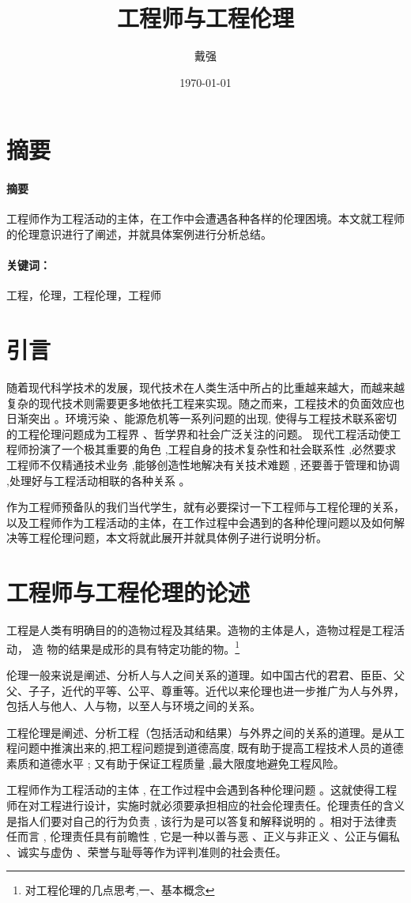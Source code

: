 \documentclass[a4paper,12pt]{ctexart}
\title{工程师与工程伦理}
\author{戴强}
\date{\today}
\renewenvironment*{abstract}[1]{%
\newcommand\gjc{#1}
\paragraph{摘要}
}{\paragraph{关键词：}\gjc }
\begin{document}
\maketitle
\newpage
\tableofcontents
\newpage
\section{摘要}
\quad
\quad

\begin{abstract}{工程，伦理，工程伦理，工程师}
  工程师作为工程活动的主体，在工作中会遭遇各种各样的伦理困境。本文就工程师的伦理意识进行了阐述，并就具体案例进行分析总结。
\end{abstract}

\newpage
\section{引言}
随着现代科学技术的发展，现代技术在人类生活中所占的比重越来越大，而越来越复杂的现代技术则需要更多地依托工程来实现。随之而来，工程技术的负面效应也日渐突出 。环境污染 、能源危机等一系列问题的出现, 使得与工程技术联系密切的工程伦理问题成为工程界 、哲学界和社会广泛关注的问题。
现代工程活动使工程师扮演了一个极其重要的角色 ,工程自身的技术复杂性和社会联系性 ,必然要求工程师不仅精通技术业务 ,能够创造性地解决有关技术难题 , 还要善于管理和协调 ,处理好与工程活动相联的各种关系 。

作为工程师预备队的我们当代学生，就有必要探讨一下工程师与工程伦理的关系，以及工程师作为工程活动的主体，在工作过程中会遇到的各种伦理问题以及如何解决等工程伦理问题，本文将就此展开并就具体例子进行说明分析。
\section{工程师与工程伦理的论述}
工程是人类有明确目的的造物过程及其结果。造物的主体是人，造物过程是工程活动， 造
物的结果是成形的具有特定功能的物。\footnote{对工程伦理的几点思考,一、基本概念}

伦理一般来说是阐述、分析人与人之间关系的道理。如中国古代的君君、臣臣、父父、子子，近代的平等、公平、尊重等。近代以来伦理也进一步推广为人与外界，包括人与他人、人与物，以至人与环境之间的关系。

工程伦理是阐述、分析工程（包括活动和结果）与外界之间的关系的道理。是从工程问题中推演出来的,把工程问题提到道德高度, 既有助于提高工程技术人员的道德素质和道德水平 ; 又有助于保证工程质量 ,最大限度地避免工程风险。

工程师作为工程活动的主体 , 在工作过程中会遇到各种伦理问题 。这就使得工程师在对工程进行设计，实施时就必须要承担相应的社会伦理责任。伦理责任的含义是指人们要对自己的行为负责 , 该行为是可以答复和解释说明的 。相对于法律责任而言 , 伦理责任具有前瞻性 , 它是一种以善与恶 、正义与非正义 、公正与偏私 、诚实与虚伪 、荣誉与耻辱等作为评判准则的社会责任。
\end{document}
